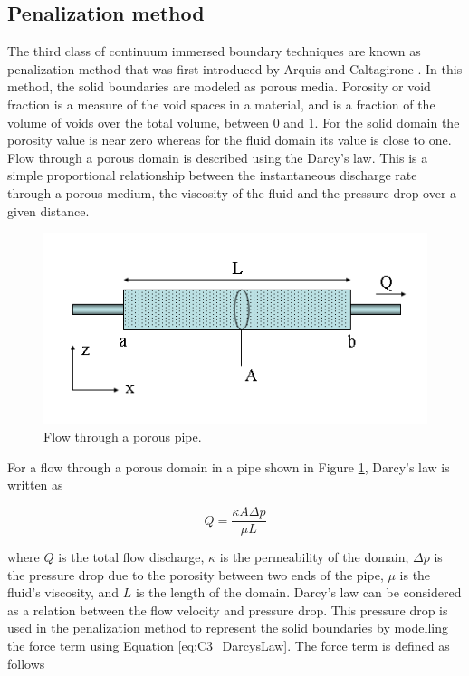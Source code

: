 \subsection{Penalization method}
The third class of continuum immersed boundary techniques are known as penalization method that was first introduced by Arquis and Caltagirone \cite{ arquis1984conditions}. In this method, the solid boundaries are modeled as porous media. Porosity or void fraction is a measure of the void spaces in a material, and is a fraction of the volume of voids over the total volume, between 0 and 1. For the solid domain the porosity value is near zero whereas for the fluid domain its value is close to one. Flow through a porous domain is described using the Darcy's law. This is a simple proportional relationship between the instantaneous discharge rate through a porous medium, the viscosity of the fluid and the pressure drop over a given distance.

\begin{figure}[H]
	\centering
	\includegraphics[width=14.cm]{Chapter_3/figure/Darcys_Law.png}
	\caption{Flow through a porous pipe.}
	\label{fig:C3_darcyEquationPipe}
\end{figure}

For a flow through a porous domain in a pipe shown in Figure \ref{fig:C3_darcyEquationPipe}, Darcy's law is written as

\begin{equation}\label{eq:C3_DarcysLaw}
	Q = \frac{\kappa A \Delta p}{\mu L}
\end{equation}

where $Q$ is the total flow discharge, $\kappa$ is the permeability of the domain, $\Delta p$ is the pressure drop due to the porosity between two ends of the pipe, $\mu$ is the fluid's viscosity, and $L$ is the length of the domain. Darcy's law can be considered as a relation between the flow velocity and pressure drop. This pressure drop  is used in the penalization method to represent the solid boundaries by modelling the force term using Equation \eqref{eq:C3_DarcysLaw}. The force term is defined as follows

